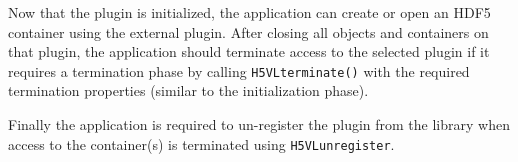 Now that the plugin is initialized, the application can create or open an HDF5 container using the external plugin. After closing all objects and containers on that plugin, the application should terminate access to the selected plugin if it requires a termination phase by calling {\tt H5VLterminate()} with the required termination properties (similar to the initialization phase). 

Finally the application is required to un-register the plugin from the library when access to the container(s) is terminated using {\tt H5VLunregister}.


